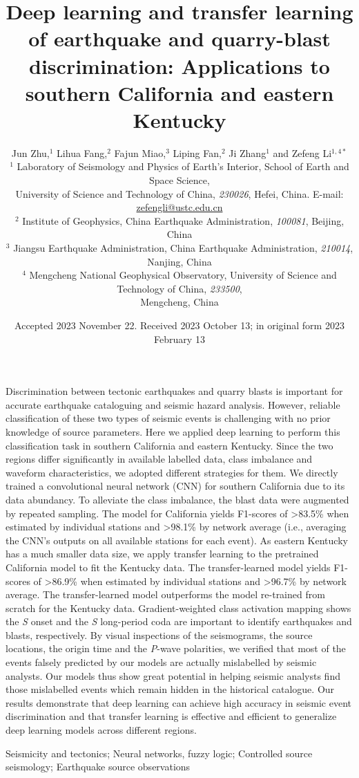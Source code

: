 \documentclass{gji}
\title[Seismic source discrimination]
  {Deep learning and transfer learning of earthquake and quarry-blast discrimination: Applications to southern California and eastern Kentucky}
\author[J. Zhu \emph{et al.}]
  {Jun Zhu,$^1$ Lihua Fang,$^2$ Fajun Miao,$^3$ Liping Fan,$^2$ Ji Zhang$^1$ and Zefeng Li$^{1,4*}$ \\
  $^1$ Laboratory of Seismology and Physics of Earth’s Interior, School of Earth and Space Science,\\University of Science and Technology of China, \emph{230026}, Hefei, China. E-mail: \href{mailto:zefengli@ustc.edu.cn}{zefengli@ustc.edu.cn}\\
  $^2$ Institute of Geophysics, China Earthquake Administration, \emph{100081}, Beijing, China\\
  $^3$ Jiangsu Earthquake Administration, China Earthquake Administration, \emph{210014}, Nanjing, China\\
  $^4$ Mengcheng National Geophysical Observatory, University of Science and Technology of China, \emph{233500},\\Mengcheng, China}
\date{Accepted 2023 November 22. Received 2023 October 13; in original form 2023 February 13}
\begin{document}
\label{firstpage}

\maketitle


\begin{summary}
Discrimination between tectonic earthquakes and quarry blasts is important for accurate earthquake cataloguing and seismic hazard analysis. However, reliable classification of these two types of seismic events is challenging with no prior knowledge of source parameters. Here we applied deep learning to perform this classification task in southern California and eastern Kentucky. Since the two regions differ significantly in available labelled data, class imbalance and waveform characteristics, we adopted different strategies for them. We directly trained a convolutional neural network (CNN) for southern California due to its data abundancy. To alleviate the class imbalance, the blast data were augmented by repeated sampling. The model for California yields F1-scores of \textgreater{83.5}\% when estimated by individual stations and \textgreater{98.1}\% by network average (i.e., averaging the CNN's outputs on all available stations for each event). As eastern Kentucky has a much smaller data size, we apply transfer learning to the pretrained California model to fit the Kentucky data. The transfer-learned model yields F1-scores of \textgreater{86.9}\% when estimated by individual stations and \textgreater{96.7}\% by network average. The transfer-learned model outperforms the model re-trained from scratch for the Kentucky data. Gradient-weighted class activation mapping shows the \textit{S} onset and the \textit{S} long-period coda are important to identify earthquakes and blasts, respectively. By visual inspections of the seismograms, the source locations, the origin time and the \textit{P}-wave polarities, we verified that most of the events falsely predicted by our models are actually mislabelled by seismic analysts. Our models thus show great potential in helping seismic analysts find those mislabelled events which remain hidden in the historical catalogue. Our results demonstrate that deep learning can achieve high accuracy in seismic event discrimination and that transfer learning is effective and efficient to generalize deep learning models across different regions.
\end{summary}

\begin{keywords}
Seismicity and tectonics; Neural networks, fuzzy logic; Controlled source seismology; Earthquake source observations
\end{keywords}
\end{document}
